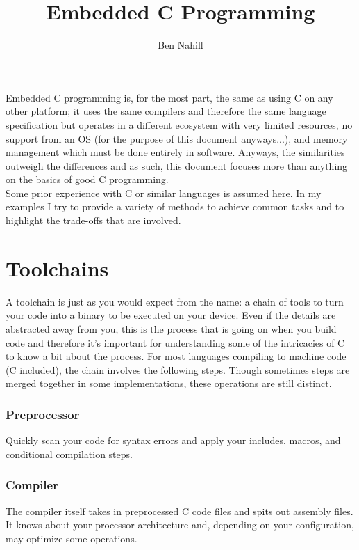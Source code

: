 \documentclass[10pt]{article}
\title{Embedded C Programming}
\author{Ben Nahill}
\begin{document}
\maketitle
\thispagestyle{empty}
\clearpage

\tableofcontents
\thispagestyle{empty}
\clearpage
{}

Embedded C programming is, for the most part, the same as using C on any other platform; it uses the same compilers and therefore the same language specification but operates in a different ecosystem with very limited resources, no support from an OS (for the purpose of this document anyways...), and memory management which must be done entirely in software. Anyways, the similarities outweigh the differences and as such, this document focuses more than anything on the basics of good C programming. \\

Some prior experience with C or similar languages is assumed here. In my examples I try to provide a variety of methods to achieve common tasks and to highlight the trade-offs that are involved.

\section{Toolchains}
A toolchain is just as you would expect from the name: a chain of tools to turn your code into a binary to be executed on your device. Even if the details are abstracted away from you, this is the process that is going on when you build code and therefore it's important for understanding some of the intricacies of C to know a bit about the process. For most languages compiling to machine code (C included), the chain involves the following steps. Though sometimes steps are merged together in some implementations, these operations are still distinct.

\subsubsection*{Preprocessor}
Quickly scan your code for syntax errors and apply your includes, macros, and conditional compilation steps. 

\subsubsection*{Compiler}

The compiler itself takes in preprocessed C code files and spits out assembly files. It knows about your processor architecture and, depending on your configuration, may optimize some operations. \\
\end{document}
